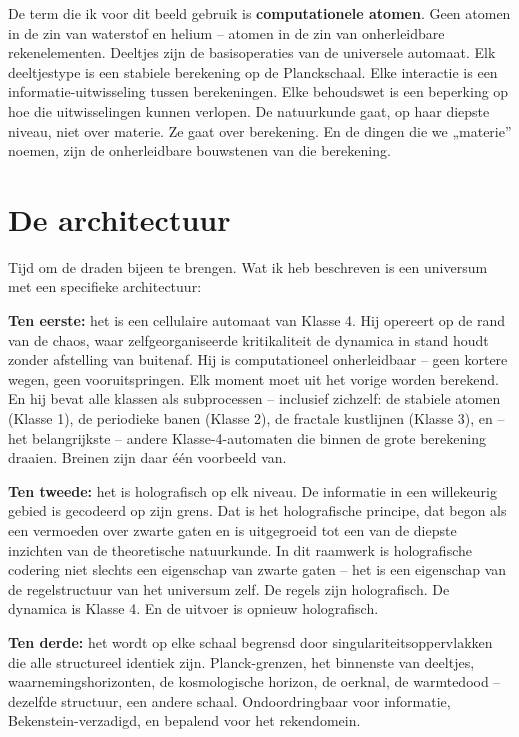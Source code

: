 \documentclass[11pt, twoside, openright]{book}
\begin{document}
De term die ik voor dit beeld gebruik is \textbf{computationele atomen}. Geen atomen in de zin van waterstof en helium -- atomen in de zin van onherleidbare rekenelementen. Deeltjes zijn de basisoperaties van de universele automaat. Elk deeltjestype is een stabiele berekening op de Planckschaal. Elke interactie is een informatie-uitwisseling tussen berekeningen. Elke behoudswet is een beperking op hoe die uitwisselingen kunnen verlopen. De natuurkunde gaat, op haar diepste niveau, niet over materie. Ze gaat over berekening. En de dingen die we „materie” noemen, zijn de onherleidbare bouwstenen van die berekening.


\section*{De architectuur}

Tijd om de draden bijeen te brengen. Wat ik heb beschreven is een universum met een specifieke architectuur:

\textbf{Ten eerste:} het is een cellulaire automaat van Klasse 4. Hij opereert op de rand van de chaos, waar zelfgeorganiseerde kritikaliteit de dynamica in stand houdt zonder afstelling van buitenaf. Hij is computationeel onherleidbaar -- geen kortere wegen, geen vooruitspringen. Elk moment moet uit het vorige worden berekend. En hij bevat alle klassen als subprocessen -- inclusief zichzelf: de stabiele atomen (Klasse 1), de periodieke banen (Klasse 2), de fractale kustlijnen (Klasse 3), en -- het belangrijkste -- andere Klasse-4-automaten die binnen de grote berekening draaien. Breinen zijn daar één voorbeeld van.

\textbf{Ten tweede:} het is holografisch op elk niveau. De informatie in een willekeurig gebied is gecodeerd op zijn grens. Dat is het holografische principe, dat begon als een vermoeden over zwarte gaten en is uitgegroeid tot een van de diepste inzichten van de theoretische natuurkunde. In dit raamwerk is holografische codering niet slechts een eigenschap van zwarte gaten -- het is een eigenschap van de regelstructuur van het universum zelf. De regels zijn holografisch. De dynamica is Klasse 4. En de uitvoer is opnieuw holografisch.

\textbf{Ten derde:} het wordt op elke schaal begrensd door singulariteitsoppervlakken die alle structureel identiek zijn. Planck-grenzen, het binnenste van deeltjes, waarnemingshorizonten, de kosmologische horizon, de oerknal, de warmtedood -- dezelfde structuur, een andere schaal. Ondoordringbaar voor informatie, Bekenstein-verzadigd, en bepalend voor het rekendomein.
\end{document}

